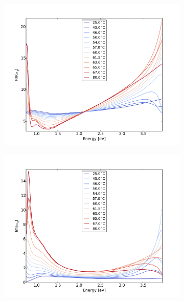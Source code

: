 %
%
\begin{figure}
    \centering
    \begin{subfigure}[b]{0.49\textwidth}
        \centering
        \includegraphics[width=\textwidth]{Results/Sim3/re_alpha_parallel.pdf}
        \caption{}
        \label{fig:2}
    \end{subfigure}
    \begin{subfigure}[b]{0.49\textwidth}
        \centering
        \includegraphics[width=\textwidth]{Results/Sim3/im_alpha_parallel.pdf}
        \caption{}
        \label{fig:2}
    \end{subfigure}

\end{figure}
